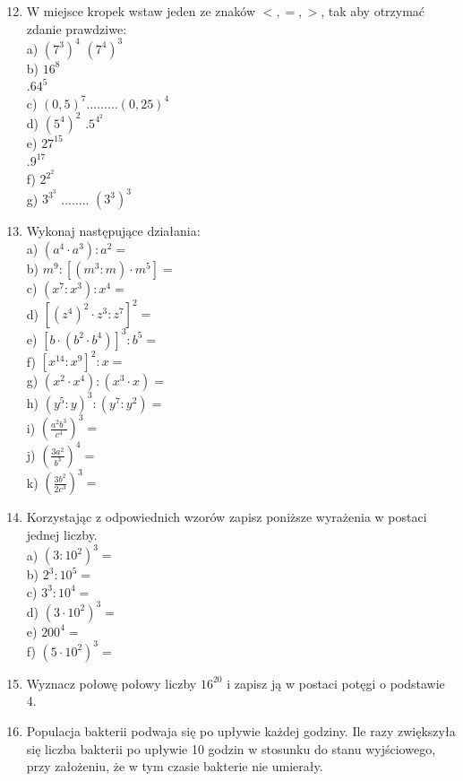 \documentclass[10pt]{article}
\begin{document}
\begin{enumerate}
  \setcounter{enumi}{11}
  \item W miejsce kropek wstaw jeden ze znaków \(<,=,>\), tak aby otrzymać zdanie prawdziwe:\\
a) \(\left(7^{3}\right)^{4}\) \(\left(7^{4}\right)^{3}\)\\
b) \(16^{8}\)\\
\(.64^{5}\)\\
c) \((0,5)^{7} \ldots \ldots \ldots(0,25)^{4}\)\\
d) \(\left(5^{4}\right)^{2}\) \(.5^{4^{2}}\)\\
e) \(27^{15}\)\\
\(.9^{17}\)\\
f) \(2^{2^{2}}\)\\
g) \(3^{3^{3}}\) ........ \(\left(3^{3}\right)^{3}\)
  \item Wykonaj następujące działania:\\
a) \(\left(a^{4} \cdot a^{3}\right): a^{2}=\)\\
b) \(m^{9}:\left[\left(m^{3}: m\right) \cdot m^{5}\right]=\)\\
c) \(\left(x^{7}: x^{3}\right): x^{4}=\)\\
d) \(\left[\left(z^{4}\right)^{2} \cdot z^{3}: z^{7}\right]^{2}=\)\\
e) \(\left[b \cdot\left(b^{2} \cdot b^{4}\right)\right]^{3}: b^{5}=\)\\
f) \(\left[x^{14}: x^{9}\right]^{2}: x=\)\\
g) \(\left(x^{2} \cdot x^{4}\right):\left(x^{3} \cdot x\right)=\)\\
h) \(\left(y^{5}: y\right)^{3}:\left(y^{7}: y^{2}\right)=\)\\
i) \(\left(\frac{a^{2} b^{3}}{c^{4}}\right)^{3}=\)\\
j) \(\left(\frac{3 a^{2}}{b^{3}}\right)^{4}=\)\\
k) \(\left(\frac{3 b^{2}}{2 c^{3}}\right)^{3}=\)
  \item Korzystając z odpowiednich wzorów zapisz poniższe wyrażenia w postaci jednej liczby.\\
a) \(\left(3: 10^{2}\right)^{3}=\)\\
b) \(2^{3}: 10^{5}=\)\\
c) \(3^{3}: 10^{4}=\)\\
d) \(\left(3 \cdot 10^{2}\right)^{3}=\)\\
e) \(200^{4}=\)\\
f) \(\left(5 \cdot 10^{2}\right)^{3}=\)
  \item Wyznacz połowę połowy liczby \(16^{20}\) i zapisz ją w postaci potęgi o podstawie 4.
  \item Populacja bakterii podwaja się po upływie każdej godziny. Ile razy zwiększyła się liczba bakterii po upływie 10 godzin w stosunku do stanu wyjściowego, przy założeniu, że w tym czasie bakterie nie umierały.
\end{enumerate}
\end{document}
